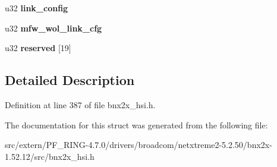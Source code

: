 \begin{DoxyCompactItemize}
\item 
\hypertarget{structport__feat__cfg_ac9f1975531555ba5b5d5bcf14f208c81}{
u32 {\bfseries link\_\-config}}
\label{structport__feat__cfg_ac9f1975531555ba5b5d5bcf14f208c81}

\item 
\hypertarget{structport__feat__cfg_a5ca8fac09da2bce24c02903bb85dd831}{
u32 {\bfseries mfw\_\-wol\_\-link\_\-cfg}}
\label{structport__feat__cfg_a5ca8fac09da2bce24c02903bb85dd831}

\item 
\hypertarget{structport__feat__cfg_a17bacbdf88808b0fcbf1b8c3ded47a8c}{
u32 {\bfseries reserved} \mbox{[}19\mbox{]}}
\label{structport__feat__cfg_a17bacbdf88808b0fcbf1b8c3ded47a8c}

\end{DoxyCompactItemize}


\subsection{Detailed Description}


Definition at line 387 of file bnx2x\_\-hsi.h.



The documentation for this struct was generated from the following file:\begin{DoxyCompactItemize}
\item 
src/extern/PF\_\-RING-\/4.7.0/drivers/broadcom/netxtreme2-\/5.2.50/bnx2x-\/1.52.12/src/bnx2x\_\-hsi.h\end{DoxyCompactItemize}
